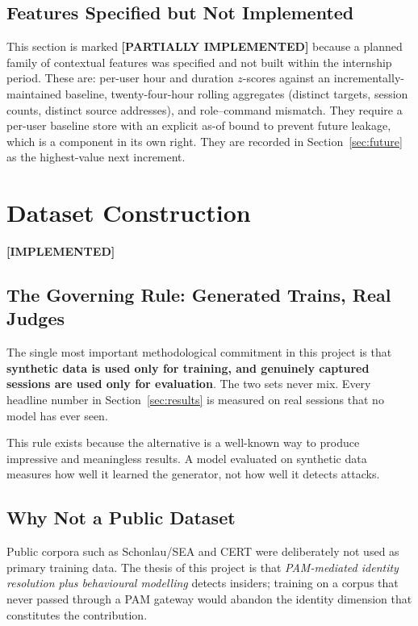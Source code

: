 \documentclass{classeENS}
\providecommand{\statusdone}{\textbf{[IMPLEMENTED]}}
\providecommand{\statuspartial}{\textbf{[PARTIALLY IMPLEMENTED]}}
\begin{document}
\subsection{Features Specified but Not Implemented}
This section is marked \statuspartial{} because a planned family of contextual features was specified and not built within the internship period. These are: per-user hour and duration $z$-scores against an incrementally-maintained baseline, twenty-four-hour rolling aggregates (distinct targets, session counts, distinct source addresses), and role--command mismatch. They require a per-user baseline store with an explicit as-of bound to prevent future leakage, which is a component in its own right. They are recorded in Section~\ref{sec:future} as the highest-value next increment.

\section{Dataset Construction}
\label{sec:datasets}
\statusdone

\subsection{The Governing Rule: Generated Trains, Real Judges}
The single most important methodological commitment in this project is that \textbf{synthetic data is used only for training, and genuinely captured sessions are used only for evaluation}. The two sets never mix. Every headline number in Section~\ref{sec:results} is measured on real sessions that no model has ever seen.

This rule exists because the alternative is a well-known way to produce impressive and meaningless results. A model evaluated on synthetic data measures how well it learned the generator, not how well it detects attacks.

\subsection{Why Not a Public Dataset}
Public corpora such as Schonlau/SEA and CERT were deliberately not used as primary training data. The thesis of this project is that \emph{PAM-mediated identity resolution plus behavioural modelling} detects insiders; training on a corpus that never passed through a PAM gateway would abandon the identity dimension that constitutes the contribution.
\end{document}
